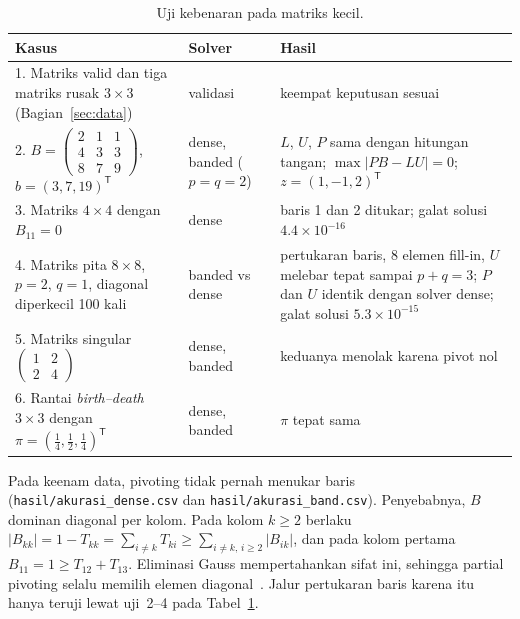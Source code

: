 \documentclass[12pt,a4paper]{article}
\newcommand{\T}{\mathsf{T}}
\numberwithin{equation}{section}
\begin{document}
\begin{table}[H]
\centering
\caption{Uji kebenaran pada matriks kecil.}
\label{tab:uji}
\small
\begin{tabular}{@{}>{\raggedright}p{}>{\raggedright}p{}>{\raggedright\arraybackslash}p{}@{}}
\toprule
Kasus & Solver & Hasil\\
\midrule
1. Matriks valid dan tiga matriks rusak $3\times3$ (Bagian~\ref{sec:data}) & validasi & keempat keputusan sesuai\\
2. $B=\left(\begin{smallmatrix}2&1&1\\4&3&3\\8&7&9\end{smallmatrix}\right)$, $b=(3,7,19)^\T$
   & dense, banded ($p=q=2$) & $L$, $U$, $P$ sama dengan hitungan tangan; $\max\lvert PB-LU\rvert=0$;
   $z=(1,-1,2)^\T$\\
3. Matriks $4\times4$ dengan $B_{11}=0$ & dense & baris 1 dan 2 ditukar; galat solusi $4.4\times10^{-16}$\\
4. Matriks pita $8\times8$, $p=2$, $q=1$, diagonal diperkecil 100 kali & banded vs dense & 7 pertukaran baris,
   8 elemen fill-in, $U$ melebar tepat sampai $p+q=3$; $P$ dan $U$ identik dengan solver dense;
   galat solusi $5.3\times10^{-15}$\\
5. Matriks singular $\left(\begin{smallmatrix}1&2\\2&4\end{smallmatrix}\right)$ & dense, banded &
   keduanya menolak karena pivot nol\\
6. Rantai \emph{birth--death} $3\times3$ dengan $\pi=(\tfrac14,\tfrac12,\tfrac14)^\T$ & dense, banded &
   $\pi$ tepat sama\\
\bottomrule
\end{tabular}
\end{table}

Pada keenam data, pivoting tidak pernah menukar baris (\texttt{hasil/akurasi\_dense.csv} dan
\texttt{hasil/akurasi\_band.csv}). Penyebabnya, $B$ dominan diagonal per kolom. Pada kolom $k\ge2$ berlaku
$\lvert B_{kk}\rvert=1-T_{kk}=\sum_{i\ne k}T_{ki}\ge\sum_{i\ne k,\,i\ge2}\lvert B_{ik}\rvert$, dan pada kolom pertama
$B_{11}=1\ge T_{12}+T_{13}$. Eliminasi Gauss mempertahankan sifat ini, sehingga partial pivoting selalu memilih elemen
diagonal~\cite{golub}. Jalur pertukaran baris karena itu hanya teruji lewat uji~2--4 pada Tabel~\ref{tab:uji}.
\end{document}

